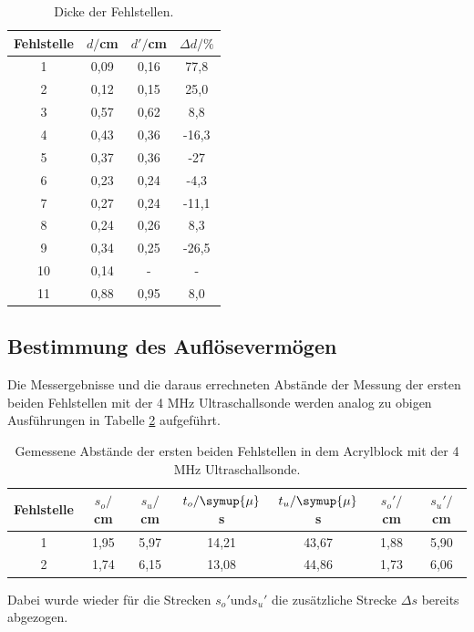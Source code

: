 \begin{table}[H]
  \centering
  \caption{Dicke der Fehlstellen.}
  \label{tab:spannung1}
  \begin{tabular}{c c c c}
    \toprule
  Fehlstelle & $d/$cm & $d'/$cm & $\Delta d/ \%$  \\
    \midrule
    1  &  0,09 & 0,16 & 77,8    \\
    2  &  0,12 & 0,15 & 25,0  \\
    3  &  0,57 & 0,62 & 8,8   \\
    4  &  0,43 & 0,36 & -16,3  \\
    5  &  0,37 & 0,36 & -27   \\
    6  &  0,23 & 0,24 & -4,3   \\
    7  &  0,27 & 0,24 & -11,1   \\
    8  &  0,24 & 0,26 & 8,3   \\
    9  &  0,34 & 0,25 & -26,5   \\
    10 &  0,14 & -    & -    \\
    11 &  0,88 & 0,95 & 8,0   \\
    \bottomrule
  \end{tabular}
\end{table}


\subsection{Bestimmung des Auflösevermögen}
Die Messergebnisse und die daraus errechneten Abstände der Messung der ersten beiden
Fehlstellen mit der 4 MHz Ultraschallsonde werden analog zu obigen Ausführungen in Tabelle \ref{tab:4} aufgeführt.

\begin{table}[H]
  \centering
  \caption{Gemessene Abstände der ersten beiden Fehlstellen in dem Acrylblock mit der 4 MHz Ultraschallsonde.}
  \label{tab:4}
  \begin{tabular}{c c c c c c c}
    \toprule
  Fehlstelle & $s_o/$cm & $s_u/$cm & $t_o/\symup{\mu}$s & $t_u/\symup{\mu}$s & $s_o'/$cm & $s_u'/$cm  \\
    \midrule
    1  &  1,95 & 5,97 & 14,21 & 43,67 & 1,88 & 5,90    \\
    2  &  1,74 & 6,15 & 13,08 & 44,86 & 1,73 & 6,06    \\
    \bottomrule
  \end{tabular}
\end{table}

Dabei wurde wieder für die Strecken $s_o' \text{und} s_u'$ die zusätzliche Strecke $\Delta s$ bereits abgezogen.

